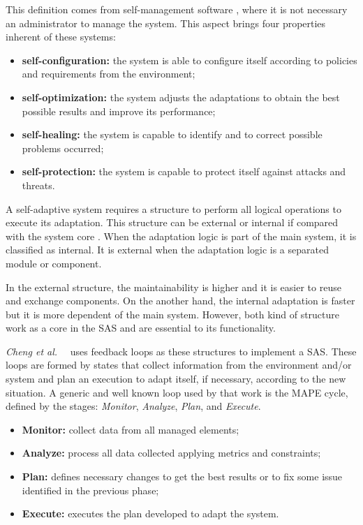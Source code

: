 This definition comes from self-management software \cite{SAS02}, where it is not necessary an administrator to manage the system. This aspect brings four properties inherent of these systems:
\begin{itemize}
    \item \textbf{self-configuration:} the system is able to configure itself according to policies and requirements from the environment;
    \item \textbf{self-optimization:} the system adjusts the adaptations to obtain the best possible results and improve its performance;
    \item \textbf{self-healing:} the system is capable to identify and to correct possible problems occurred;
    \item \textbf{self-protection:} the system is capable to protect itself against attacks and threats.
\end{itemize}

A self-adaptive system requires a structure to perform all logical operations to execute its adaptation. This structure can be external or internal if compared with the system core \cite{SAS03}. When the adaptation logic is part of the main system, it is classified as internal. It is external when the adaptation logic is a separated module or component. 

In the external structure, the maintainability is higher and it is easier to reuse and exchange components. On the another hand, the internal adaptation is faster but it is more dependent of the main system. However, both kind of structure work as a core in the SAS and are essential to its functionality.

\textit{Cheng et al.}~\cite{SAS04}~\cite{Cheng2009} uses feedback loops as these structures to implement a SAS. These loops are formed by states that collect information from the environment and/or system and plan an execution to adapt itself, if necessary, according to the new situation. A generic and well known loop used by that work is the MAPE cycle, defined by the stages: \textit{Monitor}, \textit{Analyze}, \textit{Plan}, and \textit{Execute}.

\begin{itemize}
    \item \textbf{Monitor:} collect data from all managed elements;
    \item \textbf{Analyze:} process all data collected applying metrics and constraints;
    \item \textbf{Plan:} defines necessary changes to get the best results or to fix some issue identified in the previous phase;
    \item \textbf{Execute:} executes the plan developed to adapt the system.
\end{itemize}


